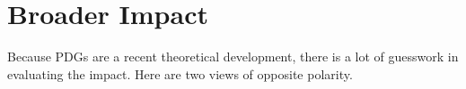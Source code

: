 \documentclass{article}
\theoremstyle{plain}
\theoremstyle{definition}
\theoremstyle{remark}
\newcommand{\todo}[1]{{\color{red}\ \!\Large\smash{\textbf{[}}{\normalsize\textsc{todo:} #1}\ \!\smash{\textbf{]}}}}
\numberwithin{equation}{section}
\begin{document}
	
	
	\section*{Broader Impact}
Because PDGs are a recent theoretical development, there is a lot of
guesswork in evaluating the impact. Here are two views of
opposite polarity.
\end{document}
